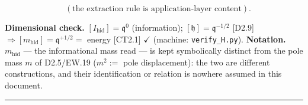 \begin{definition}
\[
\quad (\text{the extraction rule is application-layer content}).
\]

\textbf{Dimensional check.} $[I_{\mathrm{hid}}]=\mathfrak q^0$ (information); $[\mathfrak h]=\mathfrak q^{-1/2}$ [D2.9] $\Rightarrow[m_{\mathrm{hid}}]=\mathfrak q^{+1/2}=$ energy [CT2.1] $\checkmark$ (machine: \texttt{verify\_\allowbreak{}H.py}). \textbf{Notation.} $m_{\mathrm{hid}}$ — the informational mass read — is kept symbolically distinct from the pole mass $m$ of D2.5/EW.19 ($m^2:=$ pole displacement): the two are different constructions, and their identification or relation is nowhere assumed in this document.

\vspace{2pt}\noindent\rule{\textwidth}{0.4pt}\vspace{2pt}

\end{definition}

